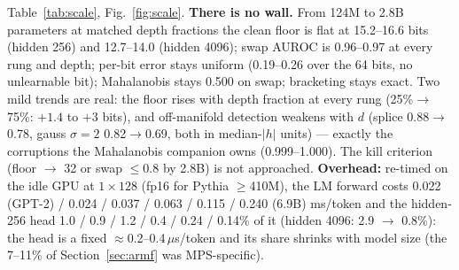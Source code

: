 \documentclass[10pt,twocolumn]{article}
\begin{document}
\begin{table}[t]\centering\small
{}
\caption{Scale ladder, 3 seeds (stds $\le0.2$ bit, $\le0.005$ AUROC). Mid-depth hidden-256 head unless
noted. Mahalanobis is 0.500 on swap and 0.996--0.999 on OOD at every rung; untrained heads
0.50; layer bracketing is a clean step ($m\le\ell$ fires, $m>\ell$ 0.50) on every rung tested.}
\label{tab:scale}
\end{table}

Table~\ref{tab:scale}, Fig.~\ref{fig:scale}. \textbf{There is no wall.} From 124M to 2.8B
parameters at matched depth fractions the clean floor is flat at 15.2--16.6 bits (hidden 256)
and 12.7--14.0 (hidden 4096); swap AUROC is 0.96--0.97 at every rung and depth; per-bit error
stays uniform (0.19--0.26 over the 64 bits, no unlearnable bit); Mahalanobis stays 0.500 on swap;
bracketing stays exact. Two mild trends are real: the floor rises with depth fraction at every
rung (25\%$\to$75\%: $+1.4$ to $+3$ bits), and off-manifold detection weakens with $d$ (splice
0.88$\to$0.78, gauss $\sigma{=}2$ 0.82$\to$0.69, both in median-$|h|$ units) --- exactly the
corruptions the Mahalanobis companion owns (0.999--1.000). The kill criterion (floor $\to$ 32
or swap $\le0.8$ by 2.8B) is not approached. \textbf{Overhead:} re-timed on the idle GPU at
$1\times128$ (fp16 for Pythia $\ge$410M), the LM forward costs 0.022 (GPT-2) / 0.024 / 0.037 /
0.063 / 0.115 / 0.240 (6.9B) ms/token and the hidden-256 head 1.0 / 0.9 / 1.2 / 0.4 / 0.24 /
0.14\% of it (hidden 4096: 2.9 $\to$ 0.8\%): the head is a fixed $\approx$0.2--0.4\,$\mu$s/token
and its share shrinks with model size (the 7--11\% of Section~\ref{sec:armf} was MPS-specific).
\end{document}
